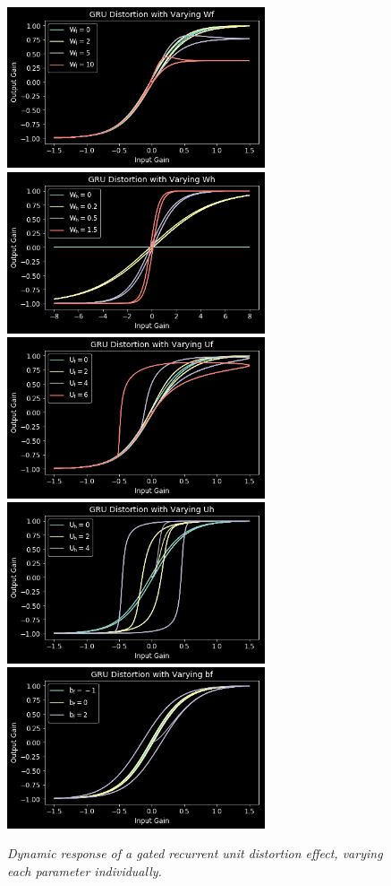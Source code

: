 \documentclass[twoside,a4paper]{article}
\begin{document}
\begin{figure}[h]
    \center
    \includegraphics[width=3in]{../GatedRecurrentDistortion/Pics/wf.png}
    \includegraphics[width=3in]{../GatedRecurrentDistortion/Pics/wh.png}
    \includegraphics[width=3in]{../GatedRecurrentDistortion/Pics/uf.png}
    \includegraphics[width=3in]{../GatedRecurrentDistortion/Pics/uh.png}
    \includegraphics[width=3in]{../GatedRecurrentDistortion/Pics/bf.png}
    \caption{\label{gru-params}{\it Dynamic response of a gated recurrent unit
    distortion effect, varying each parameter individually.}}
\end{figure}
%
\end{document}
